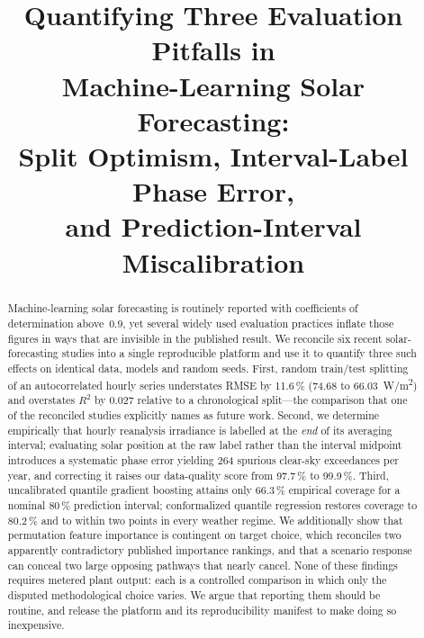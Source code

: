 \documentclass[conference]{IEEEtran}
\begin{document}
\title{Quantifying Three Evaluation Pitfalls in\\
Machine-Learning Solar Forecasting:\\
Split Optimism, Interval-Label Phase Error,\\
and Prediction-Interval Miscalibration}

\author{
}

\maketitle

\begin{abstract}
Machine-learning solar forecasting is routinely reported with
coefficients of determination above~0.9, yet several widely used
evaluation practices inflate those figures in ways that are invisible
in the published result. We reconcile six recent solar-forecasting
studies into a single reproducible platform and use it to quantify
three such effects on identical data, models and random seeds. First,
random train/test splitting of an autocorrelated hourly series
understates RMSE by 11.6\,\% (74.68 to 66.03~W/m\textsuperscript{2}) and
overstates $R^{2}$ by 0.027 relative to a chronological split---the
comparison that one of the reconciled studies explicitly names as
future work. Second, we determine empirically that hourly reanalysis
irradiance is labelled at the \emph{end} of its averaging interval;
evaluating solar position at the raw label rather than the interval
midpoint introduces a systematic phase error yielding 264 spurious
clear-sky exceedances per year, and correcting it raises our
data-quality score from 97.7\,\% to 99.9\,\%. Third, uncalibrated
quantile gradient boosting attains only 66.3\,\% empirical coverage for
a nominal 80\,\% prediction interval; conformalized quantile regression
restores coverage to 80.2\,\% and to within two points in every weather
regime. We additionally show that permutation feature importance is
contingent on target choice, which reconciles two apparently
contradictory published importance rankings, and that a scenario
response can conceal two large opposing pathways that nearly cancel.
None of these findings requires metered plant output: each is a
controlled comparison in which only the disputed methodological choice
varies. We argue that reporting them should be routine, and release the
platform and its reproducibility manifest to make doing so
inexpensive.
\end{abstract}
\end{document}

